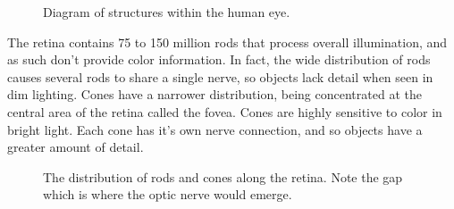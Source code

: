 \documentclass[12pt]{article}
\begin{document}
\begin{figure}[!htbp]
\begin{center}
\caption{Diagram of structures within the human eye.}
\end{center}
\end{figure}

The retina contains 75 to 150 million rods that process overall illumination, and as such don't provide color information. In fact, the wide distribution of rods causes several rods to share a single nerve, so objects lack detail when seen in dim lighting. Cones have a narrower distribution, being concentrated at the central area of the retina called the fovea. Cones are highly sensitive to color in bright light. Each cone has it's own nerve connection, and so objects have a greater amount of detail. \citep{Rafael}

\begin{figure}[!htbp]
\begin{center}
\caption{The distribution of rods and cones along the retina. Note the gap which is where the optic nerve would emerge.}
\end{center}
\end{figure}
\end{document}
